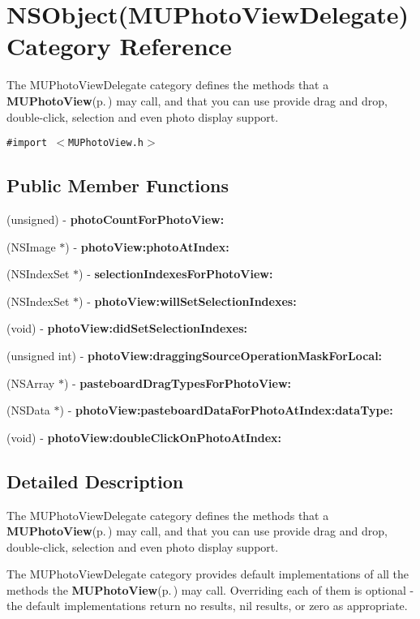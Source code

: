 \section{NSObject(MUPhoto\-View\-Delegate) Category Reference}
\label{category_n_s_object(_m_u_photo_view_delegate)}
The MUPhoto\-View\-Delegate category defines the methods that a {\bf MUPhoto\-View}{\rm (p.\,\pageref{interface_m_u_photo_view})} may call, and that you can use provide drag and drop, double-click, selection and even photo display support.  


{\tt \#import $<$MUPhoto\-View.h$>$}

\subsection*{Public Member Functions}
\begin{CompactItemize}
\item 
(unsigned) - {\bf photo\-Count\-For\-Photo\-View:}
\item 
(NSImage $\ast$) - {\bf photo\-View:photo\-At\-Index:}
\item 
(NSIndex\-Set $\ast$) - {\bf selection\-Indexes\-For\-Photo\-View:}
\item 
(NSIndex\-Set $\ast$) - {\bf photo\-View:will\-Set\-Selection\-Indexes:}
\item 
(void) - {\bf photo\-View:did\-Set\-Selection\-Indexes:}
\item 
(unsigned int) - {\bf photo\-View:dragging\-Source\-Operation\-Mask\-For\-Local:}
\item 
(NSArray $\ast$) - {\bf pasteboard\-Drag\-Types\-For\-Photo\-View:}
\item 
(NSData $\ast$) - {\bf photo\-View:pasteboard\-Data\-For\-Photo\-At\-Index:data\-Type:}
\item 
(void) - {\bf photo\-View:double\-Click\-On\-Photo\-At\-Index:}
\end{CompactItemize}


\subsection{Detailed Description}
The MUPhoto\-View\-Delegate category defines the methods that a {\bf MUPhoto\-View}{\rm (p.\,\pageref{interface_m_u_photo_view})} may call, and that you can use provide drag and drop, double-click, selection and even photo display support. 

The MUPhoto\-View\-Delegate category provides default implementations of all the methods the {\bf MUPhoto\-View}{\rm (p.\,\pageref{interface_m_u_photo_view})} may call. Overriding each of them is optional - the default implementations return no results, nil results, or zero as appropriate. 



